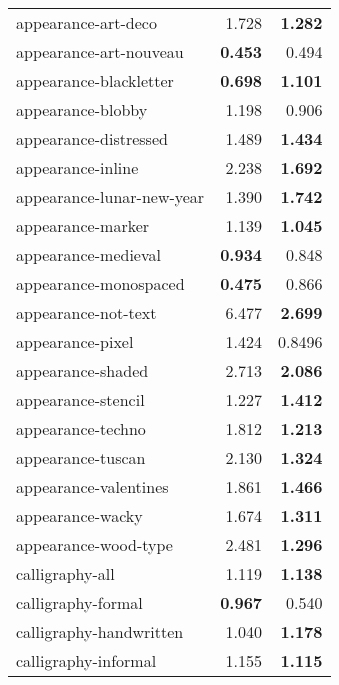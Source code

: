 \begin{longtable}{|l|r|r|}
appearance-art-deco       & 1.728                   & \textbf{1.282}      \\
appearance-art-nouveau    & \textbf{0.453}          & 0.494               \\
appearance-blackletter    & \textbf{0.698}          & \textbf{1.101}      \\
appearance-blobby         & 1.198                   & 0.906               \\
appearance-distressed     & 1.489                   & \textbf{1.434}      \\
appearance-inline         & 2.238                   & \textbf{1.692}      \\
appearance-lunar-new-year & 1.390                   & \textbf{1.742}      \\
appearance-marker         & 1.139                   & \textbf{1.045}      \\
appearance-medieval       & \textbf{0.934}          & 0.848               \\
appearance-monospaced     & \textbf{0.475}          & 0.866               \\
appearance-not-text       & 6.477                   & \textbf{2.699}      \\
appearance-pixel          & 1.424                   & 0.8496               \\
appearance-shaded         & 2.713                   & \textbf{2.086}      \\
appearance-stencil        & 1.227                   & \textbf{1.412}      \\
appearance-techno         & 1.812                   & \textbf{1.213}      \\
appearance-tuscan         & 2.130                   & \textbf{1.324}      \\
appearance-valentines     & 1.861                   & \textbf{1.466}      \\
appearance-wacky          & 1.674                   & \textbf{1.311}      \\
appearance-wood-type      & 2.481                   & \textbf{1.296}      \\
calligraphy-all           & 1.119                   & \textbf{1.138}      \\
calligraphy-formal        & \textbf{0.967}          & 0.540               \\
calligraphy-handwritten   & 1.040                   & \textbf{1.178}      \\
calligraphy-informal      & 1.155                   & \textbf{1.115}      \\

\end{longtable}
